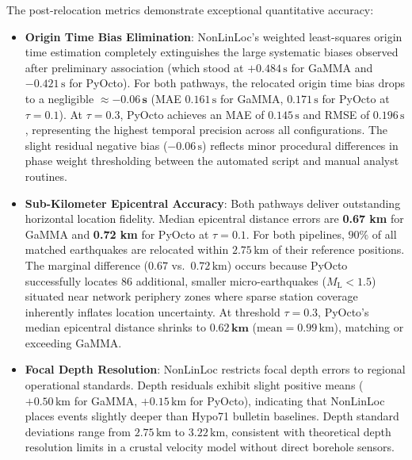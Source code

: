 The post-relocation metrics demonstrate exceptional quantitative accuracy:
\begin{itemize}
  \item \textbf{Origin Time Bias Elimination}: NonLinLoc's weighted least-squares origin time estimation completely extinguishes the large systematic biases observed after preliminary association (which stood at $+0.484\,\unit{\second}$ for GaMMA and $-0.421\,\unit{\second}$ for PyOcto). For both pathways, the relocated origin time bias drops to a negligible $\approx \mathbf{-0.06\,\unit{\second}}$ (MAE $0.161\,\unit{\second}$ for GaMMA, $0.171\,\unit{\second}$ for PyOcto at $\tau=0.1$). At $\tau=0.3$, PyOcto achieves an MAE of $0.145\,\unit{\second}$ and RMSE of $0.196\,\unit{\second}$, representing the highest temporal precision across all configurations. The slight residual negative bias ($-0.06\,\unit{\second}$) reflects minor procedural differences in phase weight thresholding between the automated script and manual analyst routines.
  \item \textbf{Sub-Kilometer Epicentral Accuracy}: Both pathways deliver outstanding horizontal location fidelity. Median epicentral distance errors are \textbf{0.67 km} for GaMMA and \textbf{0.72 km} for PyOcto at $\tau=0.1$. For both pipelines, $90\%$ of all matched earthquakes are relocated within $2.75\,\unit{\kilo\meter}$ of their reference positions. The marginal difference ($0.67$ vs.\ $0.72\,\unit{\kilo\meter}$) occurs because PyOcto successfully locates 86 additional, smaller micro-earthquakes ($M_{\mathrm{L}} < 1.5$) situated near network periphery zones where sparse station coverage inherently inflates location uncertainty. At threshold $\tau=0.3$, PyOcto's median epicentral distance shrinks to $\mathbf{0.62\,\unit{\kilo\meter}}$ ($\mathrm{mean} = 0.99\,\unit{\kilo\meter}$), matching or exceeding GaMMA.
  \item \textbf{Focal Depth Resolution}: NonLinLoc restricts focal depth errors to regional operational standards. Depth residuals exhibit slight positive means ($+0.50\,\unit{\kilo\meter}$ for GaMMA, $+0.15\,\unit{\kilo\meter}$ for PyOcto), indicating that NonLinLoc places events slightly deeper than Hypo71 bulletin baselines. Depth standard deviations range from $2.75\,\unit{\kilo\meter}$ to $3.22\,\unit{\kilo\meter}$, consistent with theoretical depth resolution limits in a crustal velocity model without direct borehole sensors.
\end{itemize}

